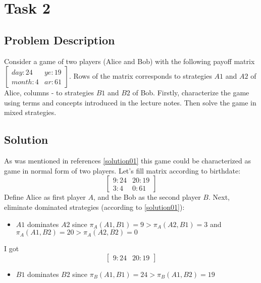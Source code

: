 \documentclass[
	a4paper, %
	11pt, %
]{CSUniSchoolLabReport}
\begin{document}
\section{Task 2}

\subsection{Problem Description}\label{writeup02}
Consider a game of two players (Alice and Bob) with the following payoff matrix
$\begin{bmatrix}
    day:24 & ye:19 \\
    month:4 & ar:61
\end{bmatrix}
$. Rows of the matrix corresponds to strategies $A1$ and $A2$ of Alice, columns - to strategies $B1$ and $B2$ of Bob. Firstly, characterize the game using terms and concepts introduced in the lecture notes. Then solve the game in mixed strategies.

\subsection{Solution}\label{solution02}
As was mentioned in references \ref{solution01} this game could be characterized as game in normal form of two players. Let's fill matrix according to birthdate:
$$
\begin{bmatrix}
    9:24 & 20:19 \\
    3:4 & 0:61
\end{bmatrix}
$$
Define Alice as first player $A$, and the Bob as the second player $B$. Next, eliminate dominated strategies (according to \ref{solution01}):
\begin{itemize}
    \item $A1$ dominates $A2$ since $\pi_A(A1, B1) = 9 > \pi_A(A2, B1) = 3$ and $\pi_A(A1, B2) = 20 > \pi_A(A2, B2) = 0$
\end{itemize}\hspace{2pt}

I got
$$
\begin{bmatrix}
    9:24 & 20:19
\end{bmatrix}
$$
\begin{itemize}
    \item $B1$ dominates $B2$ since $\pi_B(A1, B1) = 24 > \pi_B(A1, B2) = 19$
\end{itemize}\hspace{2pt}
\end{document}
